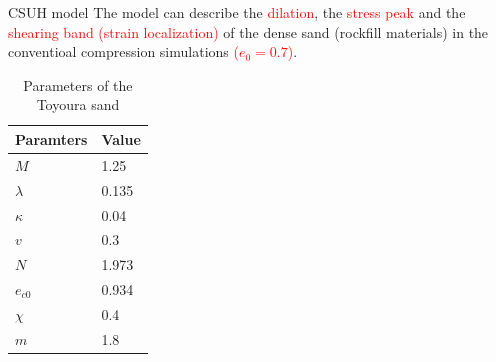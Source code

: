 \documentclass[aspectratio=169]{beamer}
\begin{document}
\begin{frame}{CSUH model}
	\fontsize{9}{9}\selectfont
	The model can describe the \textcolor{red}{dilation}, the \textcolor{red}{stress peak} and the \textcolor{red}{shearing band (strain localization)} of the dense sand (rockfill materials) in the conventioal compression simulations \textcolor{red}{($e_0=0.7$)}.
	
	\vspace{-2mm}
	\begin{minipage}[c]{0.46\linewidth}
		\fontsize{6}{6}\selectfont
		\begin{table}[]
			\caption{Parameters of the Toyoura sand}
			\begin{tabular}{ll}
				\hline
				Paramters & Value \\ \hline
				$M$       & 1.25  \\
				$\lambda$ & 0.135 \\
				$\kappa$  & 0.04  \\
				$v$       & 0.3   \\
				$N$       & 1.973 \\
				$e_{c0}$  & 0.934 \\
				$\chi$    & 0.4   \\
				$m$       & 1.8   \\ \hline
			\end{tabular}
		\end{table}
	\fontsize{6}{6}\selectfont
	

\end{minipage}
\end{frame}
\end{document}
